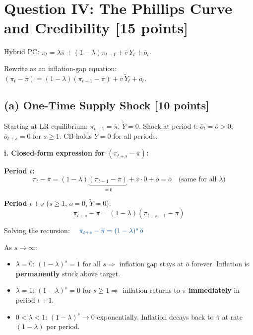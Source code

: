 \documentclass[letterpaper,12pt]{article}
\begin{document}
\section*{Question IV: The Phillips Curve and Credibility [15 points]}

\noindent Hybrid PC: $\pi_t = \lambda\overline{\pi} + (1-\lambda)\pi_{t-1} + \overline{v}\,\widetilde{Y}_t + \overline{o}_t$.

\noindent Rewrite as an inflation-gap equation: $(\pi_t - \overline{\pi}) = (1-\lambda)(\pi_{t-1}-\overline{\pi}) + \overline{v}\,\widetilde{Y}_t + \overline{o}_t$.

\subsection*{(a) One-Time Supply Shock [10 points]}

\noindent Starting at LR equilibrium: $\pi_{t-1} = \overline{\pi}$, $\widetilde{Y} = 0$. Shock at period $t$: $\overline{o}_t = \overline{o} > 0$; $\overline{o}_{t+s} = 0$ for $s \geq 1$. CB holds $\widetilde{Y} = 0$ for all periods.

\noindent\textbf{i. Closed-form expression for $(\pi_{t+s} - \overline{\pi})$:}

\textbf{Period $t$:}
\[
\pi_t - \overline{\pi} = (1-\lambda)\underbrace{(\pi_{t-1}-\overline{\pi})}_{=0} + \overline{v}\cdot 0 + \overline{o} = \overline{o}
\quad \text{(same for all } \lambda\text{)}
\]

\textbf{Period $t+s$} ($s \geq 1$, $\overline{o} = 0$, $\widetilde{Y} = 0$):
\[
\pi_{t+s} - \overline{\pi} = (1-\lambda)(\pi_{t+s-1} - \overline{\pi})
\]

Solving the recursion: $\quad \textcolor{sol}{\pi_{t+s} - \overline{\pi} = (1-\lambda)^s\,\overline{o}}$

As $s \to \infty$:
\begin{itemize}
  \item $\lambda = 0$: $(1-\lambda)^s = 1$ for all $s \Rightarrow$ inflation gap stays at $\overline{o}$ forever. Inflation is \textbf{permanently} stuck above target.
  \item $\lambda = 1$: $(1-\lambda)^s = 0$ for $s \geq 1 \Rightarrow$ inflation returns to $\overline{\pi}$ \textbf{immediately} in period $t+1$.
  \item $0 < \lambda < 1$: $(1-\lambda)^s \to 0$ exponentially. Inflation decays back to $\overline{\pi}$ at rate $(1-\lambda)$ per period.
\end{itemize}
\end{document}
